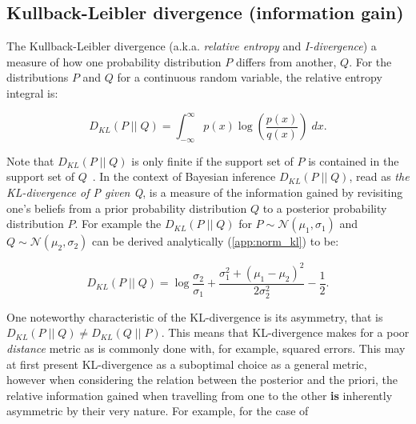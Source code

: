 \subsection{Kullback-Leibler divergence (information gain)\label{sec:kl_div}}

The Kullback-Leibler divergence (a.k.a. \textit{relative entropy} and
\textit{I-divergence}) a measure of how one probability distribution $P$ differs
from another, $Q$. For the distributions $P$ and $Q$ for a continuous random
variable, the relative entropy integral is:

\begin{equation}
    D_{KL}(P\;||\;Q) = \int_{-\infty}^{\infty}p(x)\log(\frac{p(x)}{q(x)})\;dx.
    \label{eq:kullback-leibler}
\end{equation}

Note that $D_{KL}(P\;||\;Q)$ is only finite if the support set of $P$ is
contained in the support set of $Q$~\cite[p.~251]{Cover2006}. In the context
of Bayesian inference $D_{KL}(P\;||\;Q)$, read as \textit{the KL-divergence of P
given Q}, is a measure of the information gained by revisiting one's beliefs
from a prior probability distribution $Q$ to a posterior probability
distribution $P$. For example the $D_{KL}(P\;||\;Q)$ for
$P\sim{}\mathcal{N}(\mu_1,\sigma_1)$ and $Q\sim{}\mathcal{N}(\mu_2,\sigma_2)$ can be derived
analytically (\autoref{app:norm_kl}) to be:

\begin{equation}
    D_{KL}(P\;||\;Q) = \log\frac{\sigma_2}{\sigma_1} + \frac{\sigma_1^2 + (\mu_1-\mu_2)^2}{2\sigma_2^2} - \frac{1}{2}.
\end{equation}
%

One noteworthy characteristic of the KL-divergence is its asymmetry, that is
$D_{KL}(P\;||\;Q)\neq{}D_{KL}(Q\;||\;P)$. This means that KL-divergence makes
for a poor \textit{distance} metric as is commonly done with, for example,
squared errors. This may at first present KL-divergence as a suboptimal choice
as a general metric, however when considering the relation between the posterior
and the priori, the relative information gained when travelling from one to the
other \textbf{is} inherently asymmetric by their very nature. For example, for
the case of

